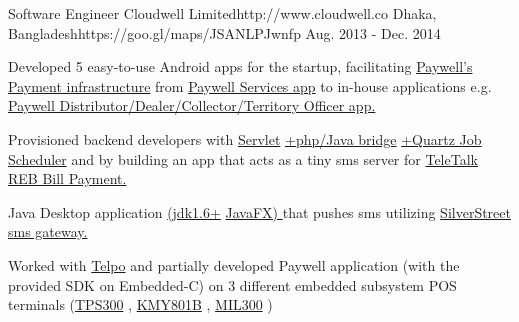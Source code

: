 \begin{workentries}
\workentry
{Software Engineer} %
{Cloudwell Limited}{http://www.cloudwell.co} %
{Dhaka, Bangladesh}{https://goo.gl/maps/JSANLPJwnfp} %
{Aug. 2013 - Dec. 2014} %
    {
      \begin{workitems} %
        \item {Developed 5 easy-to-use Android apps for the startup, facilitating 
        {\href{https://www.paywellonline.com/web_paywell/index.php}{Paywell's Payment infrastructure}} 
        from 
        {\href{https://www.youtube.com/channel/UCf_R7aYkzyn_CGZw4xgkNEA}{Paywell Services app}}
        to in-house applications e.g.
        {\href{https://futurestartup.com/2018/03/13/the-evolution-of-cloudwell-clouldwells-strategy-and-ambition-an-interview-with-anisul-islam-founder-and-ceo-cloudwell/}
        {Paywell Distributor/Dealer/Collector/Territory Officer app.}}
        }
        \item {Provisioned backend developers with 
        {\href{https://docs.oracle.com/javaee/6/api/javax/servlet/Servlet.html}{Servlet}}
        {\href{http://php-java-bridge.sourceforge.net/pjb/servlet-programming.php}{+php/Java bridge}}
        {\href{http://www.quartz-scheduler.org}{+Quartz Job Scheduler}}
        and by building an app that acts as a tiny sms server for 
        {\href{http://www.teletalk.com.bd/dynamicLayout.jsp?page=40002&menuItem=7006}{TeleTalk REB Bill Payment.}}
        \item Java Desktop application 
        {\href{https://www.oracle.com/technetwork/java/javase/java-archive-downloads-javase6-419409.html}{(jdk1.6+}}
        {\href{https://en.wikipedia.org/wiki/JavaFX}{JavaFX) }}
        that pushes sms utilizing 
        {\href{https://www.silverstreet.com}{SilverStreet sms gateway.}}
        }
        \item {Worked with 
        {\href{http://www.telpo.com.cn}{Telpo}}
        and partially developed Paywell application (with the provided SDK on Embedded-C) on 3 different embedded subsystem POS terminals 
        ({\href{https://www.alibaba.com/product-detail/-Telpo-TPS300-EFT-pos-GPRS_576805259.html}{TPS300}}
         , {\href{https://kmychina.en.made-in-china.com/product/xeyJnSQWglcs/China-GPRS-POS-with-PCI-Pinpad-KMY801B-.html}{KMY801B}}
         , {\href{http://movotek.com/products/pos-terminal-mil300/}{MIL300}}         
        )
        }
      \end{workitems}
    }


\end{workentries}
